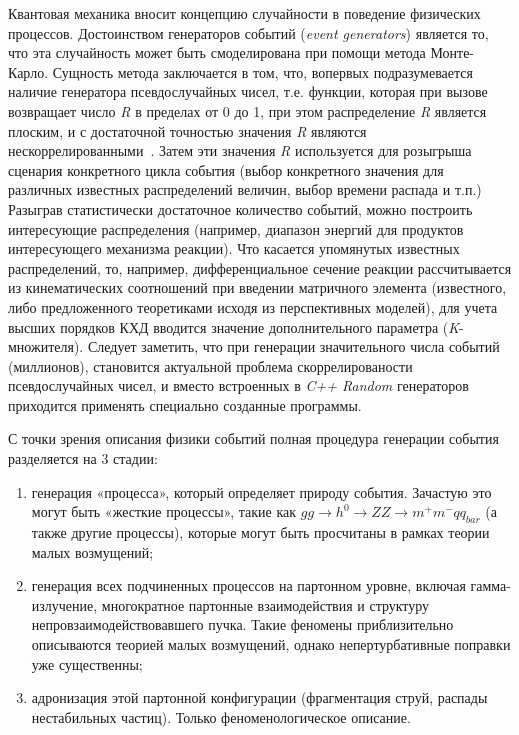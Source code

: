 Квантовая механика вносит концепцию случайности в
поведение физических процессов. Достоинством
генераторов событий (\textit{event generators}) является то, что эта
случайность может быть смоделирована при помощи метода
Монте-Карло. Сущность метода заключается в том, что, вопервых подразумевается наличие генератора
псевдослучайных чисел, т.е. функции, которая при вызове
возвращает число \textit{R} в пределах от 0 до 1, при этом
распределение \textit{R} является плоским, и с достаточной
точностью значения \textit{R} являются нескоррелированными~\cite{review-pythia}.
Затем эти значения \textit{R} используется для розыгрыша сценария
конкретного цикла события (выбор конкретного значения
для различных известных распределений величин, выбор
времени распада и т.п.) Разыграв статистически достаточное
количество событий, можно построить интересующие распределения (например, диапазон энергий для
продуктов интересующего механизма реакции).
Что касается упомянутых известных распределений,
то, например, дифференциальное сечение реакции
рассчитывается из кинематических соотношений при
введении матричного элемента (известного, либо
предложенного теоретиками исходя из перспективных
моделей), для учета высших порядков КХД вводится
значение дополнительного параметра (\textit{K}-множителя).
Следует заметить, что при генерации значительного
числа событий (миллионов), становится актуальной
проблема скоррелированости псевдослучайных чисел, и
вместо встроенных в \textit{C++ Random} генераторов приходится
применять специально созданные программы.


С точки зрения описания физики событий полная
процедура генерации события разделяется на 3 стадии:

\begin{enumerate}
	\item генерация «процесса», который определяет природу
	события. Зачастую это могут быть «жесткие процессы»,
	такие как $gg \rightarrow {h}^{0} \rightarrow ZZ \rightarrow {m}^{+}{m}^{-}{qq}_{bar}$ (а также другие
	процессы), которые могут быть просчитаны в рамках
	теории малых возмущений;

	\item генерация всех подчиненных процессов на партонном
	уровне, включая гамма-излучение, многократное партонные
	взаимодействия и структуру непровзаимодействовавшего
	пучка. Такие феномены приблизительно описываются
	теорией малых возмущений, однако непертурбативные
	поправки уже существенны;
	\item адронизация этой партонной конфигурации
	(фрагментация струй, распады нестабильных частиц).
	Только феноменологическое описание.
\end{enumerate}

